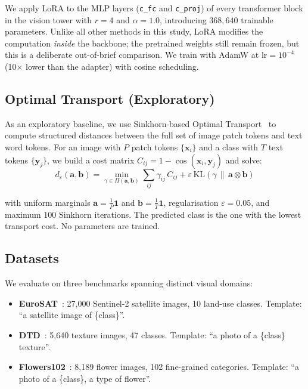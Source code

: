 \documentclass[10pt,twocolumn,letterpaper]{article}
\begin{document}
We apply LoRA to the MLP layers (\texttt{c\_fc} and \texttt{c\_proj}) of every transformer block in the vision tower with $r = 4$ and $\alpha = 1.0$, introducing $368{,}640$ trainable parameters. Unlike all other methods in this study, LoRA modifies the computation \emph{inside} the backbone; the pretrained weights still remain frozen, but this is a
deliberate out-of-brief comparison.  We train with AdamW at $\mathrm{lr} = 10^{-4}$ (10$\times$ lower than the adapter) with cosine scheduling.

\subsection{Optimal Transport (Exploratory)}\label{sec:ot}

As an exploratory baseline, we use Sinkhorn-based Optimal Transport~\cite{cuturi2013sinkhorn} to compute structured distances between the full set of image patch tokens and text word tokens. For an image with $P$ patch tokens $\{\mathbf{x}_i\}$ and a class with $T$ text tokens $\{\mathbf{y}_j\}$, we build a cost matrix $C_{ij} = 1 - \cos(\mathbf{x}_i, \mathbf{y}_j)$ and solve: 
\begin{equation}\label{eq:sinkhorn}
  d_{\varepsilon}(\mathbf{a}, \mathbf{b})
    = \min_{\gamma \in \Pi(\mathbf{a}, \mathbf{b})}
      \sum_{ij} \gamma_{ij}\,C_{ij}
      + \varepsilon\,\mathrm{KL}(\gamma \,\|\, \mathbf{a} \otimes \mathbf{b})
\end{equation}

with uniform marginals $\mathbf{a} = \frac{1}{P}\mathbf{1}$ and $\mathbf{b} = \frac{1}{T}\mathbf{1}$, regularisation $\varepsilon = 0.05$, and maximum 100 Sinkhorn iterations.  The predicted class is the one with the lowest transport cost.  No parameters are trained.


\subsection{Datasets}\label{sec:datasets}

We evaluate on three benchmarks spanning distinct visual domains:

\begin{itemize}
  \item \textbf{EuroSAT}~\cite{helber2019eurosat}: 27{,}000 Sentinel-2 satellite images, 10 land-use classes.  Template: ``a satellite image of \{class\}''.
  
  \item \textbf{DTD}~\cite{cimpoi2014describing}: 5{,}640 texture images, 47 classes.  Template: ``a photo of a \{class\} texture''.
  
  \item \textbf{Flowers102}~\cite{nilsback2008automated}: 8{,}189 flower images, 102 fine-grained categories.  Template: ``a photo of a \{class\}, a type of flower''.
\end{itemize}
\end{document}
